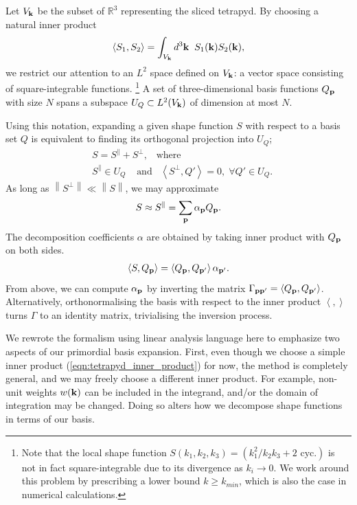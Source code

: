 Let $V_{\mathbf{k}}$ be the subset of $\mathbb{R}^3$ representing the sliced tetrapyd. By choosing a natural inner product
\begin{align}
	\left< S_1, S_2 \right> = \int_{V_{\mathbf{k}}} d^3\mathbf{k} \;\; S_1(\mathbf{k}) S_2(\mathbf{k}), \label{eqn:tetrapyd_inner_product}
\end{align}
we restrict our attention to an $L^2$ space defined on $V_{\mathbf{k}}$: a vector space consisting of square-integrable functions.
\footnote{Note that the local shape function $S(k_1,k_2,k_3) = (k_1^2 / k_2 k_3 + \text{2 cyc.})$ is not in fact square-integrable due to its divergence as $k_i \rightarrow 0$. We work around this problem by prescribing a lower bound $k \ge k_{min}$, which is also the case in numerical calculations.}
A set of three-dimensional basis functions $Q_{\mathbf{p}}$ with size $N$ spans a subspace $U_{Q} \subset L^2(V_{\mathbf{k}})$ of dimension at most $N$.

Using this notation, expanding a given shape function $S$ with respect to a basis set $Q$ is equivalent to finding its orthogonal projection into $U_{Q}$;
\begin{align}
	&S = S^{\parallel} + S^{\perp}, \;\;\;\text{where} \\
	&S^{\parallel} \in U_Q \;\;\;\;\text{and} \;\;\; \left< S^{\perp}, Q' \right> = 0, \; \forall Q' \in U_Q.
\end{align}
As long as $\left\| S^\perp \right\| \ll \left\| S \right\|$, we may approximate
\begin{align}
	S \approx S^\parallel = \sum_{\mathbf{p}} \alpha_{\mathbf{p}} Q_{\mathbf{p}}.  \label{eqn:primordial_basis_projection}
\end{align}
The decomposition coefficients $\alpha$ are obtained by taking inner product with $Q_{\mathbf{p}}$ on both sides.
\begin{align}
	\left< S, Q_\mathbf{p} \right> = \left< Q_\mathbf{p}, Q_{\mathbf{p}'} \right> \alpha_{\mathbf{p}'}. \label{eqn:primordial_basis_expansion_SQ_and_QQ}
\end{align}
From above, we can compute $\alpha_\mathbf{p}$ by inverting the matrix $\Gamma_{\mathbf{p} \mathbf{p}'} = \left< Q_\mathbf{p}, Q_{\mathbf{p}'} \right>$. Alternatively, orthonormalising the basis with respect to the inner product $\left< , \right>$ turns $\Gamma$ to an identity matrix, trivialising the inversion process.

We rewrote the formalism using linear analysis language here to emphasize two aspects of our primordial basis expansion. First, even though we choose a simple inner product (\ref{eqn:tetrapyd_inner_product}) for now, the method is completely general, and we may freely choose a different inner product. For example, non-unit weights $w(\mathbf{k})$ can be included in the integrand, and/or the domain of integration may be changed. Doing so alters how we decompose shape functions in terms of our basis.

